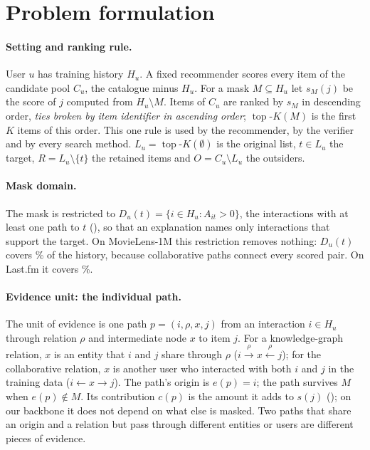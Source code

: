 \documentclass[11pt]{article}
\newcommand{\topk}{\operatorname{top}\text{-}K}
\begin{document}
\section{Problem formulation}
\label{sec:problem}

\paragraph{Setting and ranking rule.} User $u$ has training history $H_u$. A fixed recommender scores every item of
the candidate pool $C_u$, the catalogue minus $H_u$. For a mask $M\subseteq H_u$ let $s_M(j)$ be the score of $j$
computed from $H_u\setminus M$. Items of $C_u$ are ranked by $s_M$ in descending order, \emph{ties broken by item
identifier in ascending order}; $\topk(M)$ is the first $K$ items of this order. This one rule is used by the
recommender, by the verifier and by every search method. $L_u=\topk(\emptyset)$ is the original list, $t\in L_u$ the
target, $R=L_u\setminus\{t\}$ the retained items and $O=C_u\setminus L_u$ the outsiders.

\paragraph{Mask domain.} The mask is restricted to $D_u(t)=\{i\in H_u: A_{it}>0\}$, the interactions with at least
one path to $t$ (), so that an explanation names only interactions that support the target. On
MovieLens-1M this restriction removes nothing: $D_u(t)$ covers \MLScope\% of the history, because collaborative
paths connect every scored pair. On Last.fm it covers \LFScope\%.

\paragraph{Evidence unit: the individual path.} The unit of evidence is one path $p=(i,\rho,x,j)$ from an
interaction $i\in H_u$ through relation $\rho$ and intermediate node $x$ to item $j$. For a knowledge-graph relation,
$x$ is an entity that $i$ and $j$ share through $\rho$ ($i\xrightarrow{\rho}x\xleftarrow{\rho}j$); for the
collaborative relation, $x$ is another user who interacted with both $i$ and $j$ in the training data
($i\leftarrow x\to j$). The path's origin is $e(p)=i$; the path survives $M$ when $e(p)\notin M$. Its contribution
$c(p)$ is the amount it adds to $s(j)$ (); on our backbone it does not depend on what else is masked.
Two paths that share an origin and a relation but pass through different entities or users are different pieces of
evidence.
\end{document}
